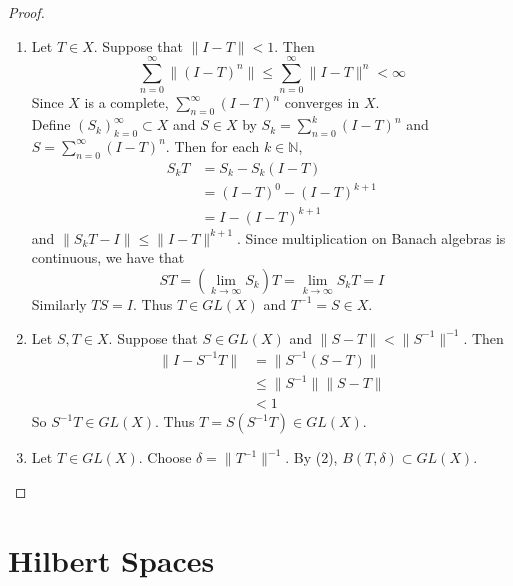\documentclass[12pt]{amsart}
\theoremstyle{definition}
\theoremstyle{remark}
\theoremstyle{definition}
\newcommand{\del}{\delta}
\newcommand{\N}{\mathbb{N}}
\begin{document}
	\begin{proof}\
		\begin{enumerate}
			\item Let $T \in X$. Suppose that $\|I-T \|< 1$. Then $$\sum_{n=0}^{\infty} \|(I -T)^n \| \leq \sum_{n=0}^{\infty} \|I -T \|^{n} < \infty$$ Since $X$ is a complete, $\sum\limits_{n=0}^{\infty}(I-T)^n$ converges in $X$.\\
			Define $(S_k)_{k=0}^{\infty} \subset X$ and $S \in X$ by $S_k = \sum\limits_{n=0}^{k} (I-T)^n$ and \\ $S = \sum\limits_{n=0}^{\infty}(I-T)^n$. Then for each $k \in \N$,
			\begin{align*}
				S_k T
				&= S_k - S_k(I-T) \\
				&= (I-T)^0 - (I-T)^{k+1} \\
				&= I - (I-T)^{k+1}
			\end{align*}
			and $\|S_kT - I \|\leq \|I-T \|^{k+1}$. Since multiplication on Banach algebras is continuous, we have that $$ST = (\lim_{k \rightarrow \infty} S_k)T = \lim\limits_{k \rightarrow \infty}S_kT = I$$
			Similarly $TS = I$. Thus $T \in GL(X)$ and $T^{-1} = S \in X$. \vspace{.5cm}\\
			\item  Let $S, T \in X$. Suppose that $S \in GL(X)$ and $\|S-T \|< \|S^{-1} \|^{-1}$. Then 
			\begin{align*}
				\|I - S^{-1}T \|
				& = \|S^{-1}(S - T) \|\\
				& \leq \|S^{-1} \|\|S -T \|\\
				&< 1
			\end{align*}
			So $S^{-1}T \in GL(X)$. Thus $T = S (S^{-1}T) \in GL(X)$. \vspace{.5cm}\\
			\item Let $T \in GL(X)$. Choose $\del = \|T^{-1}\|^{-1}$. By (2), $B(T, \del) \subset GL(X)$.
		\end{enumerate}
	\end{proof}	
	
	
	
	\newpage
	
	
	
	
	
	
	
	
	
	
	
	
	
	
	
	
	\newpage
	\section{Hilbert Spaces}
	
\end{document}
